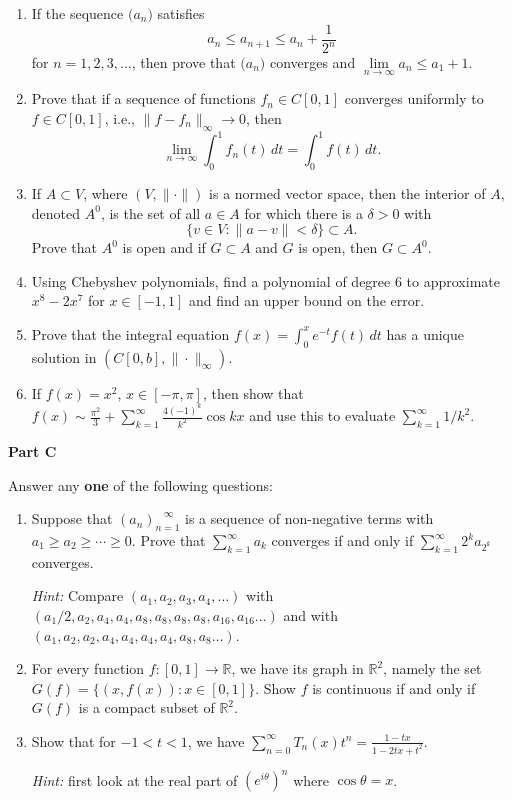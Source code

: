 \documentclass[11pt]{article}
\def\bR{\mathbb{R}}
\newcommand{\dlim}{\lim\limits}
\newcommand{\dsum}{\sum\limits}
\newcommand{\sequ}[2][n]{{ \left( #2 \right)_{#1=1}^{\,\,\,\,\,\infty} }}
\begin{document}
\begin{enumerate}
\item If the sequence $\bigl( a_n \bigr)$ satisfies
	$$ a_n \le a_{n+1} \le a_n + \frac 1 {2^n} $$
	for $n=1,2,3,\ldots$, then prove that $\bigl( a_n \bigr)$
	converges and $\dlim_{n \to \infty} a_n \le a_1 + 1 $.

\item Prove that if a sequence of functions $f_n \in C[0,1]$
	converges uniformly to $f \in C[0,1]$, i.e., $\|f-f_n\|_\infty \to 0$,
	then
	$$ \lim_{n\to\infty} \int_0^1 f_n(t)\, dt = \int_0^1 f(t)\, dt.$$

\item If $A \subset V$, where $(V,\|\cdot\|)$ is a normed vector
	space, then the interior of $A$, denoted $A^0$, is the set of all
	$a \in A$ for which there is a $\delta > 0$ with
		$$ \{ v \in V : \| a - v \| < \delta \} \subset A. $$
	Prove that $A^0$ is open and if $G \subset A$ and $G$ is open, then
	$G \subset A^0$.

\item Using Chebyshev polynomials, find a polynomial of degree 6 to
	approximate $x^8-2x^7$ for $x \in [-1,1]$ and find an upper 
	bound on the error.

\item Prove that the integral equation 
	$\displaystyle f(x) = \int_0^x e^{-t} f(t) \, dt $
	has a unique solution in $(C[0,b],\|\cdot\|_\infty)$.

\item If $f(x) = x^2$, $x \in [-\pi,\pi]$, then show that
	$\displaystyle f(x) \sim \frac {\pi^2} 3 + \sum_{k=1}^\infty  
		\frac {4(-1)^k} {k^2} \cos kx $
	and use this to evaluate $\dsum_{k=1}^\infty 1/k^2$.

\end{enumerate}

\noindent
{\large \bf Part C}
\medskip

Answer any {\bf one} of the following questions: 

\begin{enumerate}
\item Suppose that $\sequ {a_n}$ is a sequence of non-negative terms
	with $a_1 \ge a_2 \ge \cdots \ge 0$.  Prove that 
	$\dsum_{k=1}^\infty a_k$ converges if and only if 
	$\dsum_{k=1}^\infty 2^k a_{2^k}$ converges.

	\textsl{Hint:} Compare $(a_1,a_2,a_3,a_4,\ldots)$ with 
	$(a_1/2,a_2,a_4,a_4,a_8,a_8,a_8,a_8,a_{16},a_{16}\ldots)$
	and with $(a_1,a_2,a_2,a_4,a_4,a_4,a_4,a_8,a_8\ldots)$.

\item For every function $f: [0,1] \to \bR$, we have its graph in $\bR^2$,
	namely the set $G(f) = \{ (x,f(x)) : x \in [0,1] \}$.
	Show  $f$ is continuous if and only if $G(f)$ is a compact
	subset of $\bR^2$.

\item Show that for $-1 < t < 1$, we have $\displaystyle 
	\sum_{n=0}^\infty T_n(x) t^n = \frac {1-tx} {1-2tx+t^2}$.

	\textsl{Hint:} first look at the real part of $(e^{i\theta})^n$ where 
	$\cos\theta=x$.

\end{enumerate}
\end{document}
